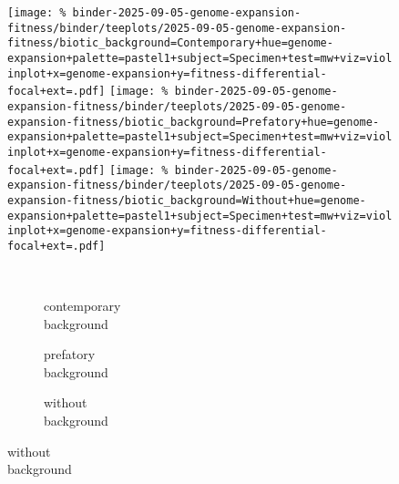\begin{figure}

\texttt{[image: \%
binder-2025-09-05-genome-expansion-fitness/binder/teeplots/2025-09-05-genome-expansion-fitness/biotic\_background=Contemporary+hue=genome-expansion+palette=pastel1+subject=Specimen+test=mw+viz=violinplot+x=genome-expansion+y=fitness-differential-focal+ext=.pdf]}
\texttt{[image: \%
binder-2025-09-05-genome-expansion-fitness/binder/teeplots/2025-09-05-genome-expansion-fitness/biotic\_background=Prefatory+hue=genome-expansion+palette=pastel1+subject=Specimen+test=mw+viz=violinplot+x=genome-expansion+y=fitness-differential-focal+ext=.pdf]}%
\texttt{[image: \%
binder-2025-09-05-genome-expansion-fitness/binder/teeplots/2025-09-05-genome-expansion-fitness/biotic\_background=Without+hue=genome-expansion+palette=pastel1+subject=Specimen+test=mw+viz=violinplot+x=genome-expansion+y=fitness-differential-focal+ext=.pdf]}

\vspace{-1ex}

\begin{subfigure}{0.135\linewidth}
~
\end{subfigure}%
\begin{subfigure}{0.305\linewidth}
    \centering
    \caption{\footnotesize contemporary\\background}
    \label{fig:genome-expansion:contemporary}
\end{subfigure}%
\begin{subfigure}{0.305\linewidth}
    \centering
    \caption{\footnotesize prefatory\\background}
    \label{fig:genome-expansion:prefatory}
\end{subfigure}%
\begin{subfigure}{0.255\linewidth}
    \centering
    \caption{\footnotesize without\\background}
    \label{fig:genome-expansion:without}
\end{subfigure}


\end{figure}
